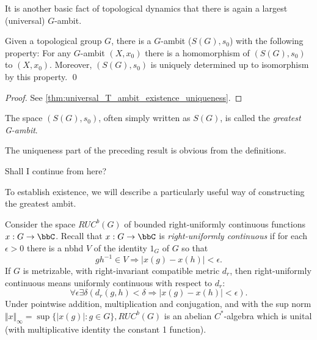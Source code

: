 It is another basic fact of topological dynamics that there is again
a largest (universal) $G$-ambit.

\begin{theorem}
    \label{1.2}
    Given a topological group $G$, there is a
    $G$-ambit ($S(G), s_0$) with the following property:  For any $G$-ambit
    $(X,x_0)$ there is a homomorphism of $(S(G), s_0)$ to $(X,x_0)$.  Moreover,
    $(S(G), s_0)$ is uniquely determined up to isomorphism by this property.
    \qed
\end{theorem}

\begin{proof}
    See \ref{thm:universal_T_ambit_existence_uniqueness}.
\end{proof}

The space $(S(G),s_0)$, often simply written as $S(G)$, is called the {\it
        greatest G-ambit}.

The uniqueness part of the preceding result is obvious from the definitions.


\begin{mynote}
    Shall I continue from here?
\end{mynote}

To establish existence, we will describe a particularly useful way of
constructing the greatest ambit.

Consider the space $RUC^b(G)$ of bounded right-uniformly continuous functions $x:G\rightarrow\bbC$.
Recall that $x:G\rightarrow\bbC$ is {\it right-uniformly continuous} if for
each $\epsilon >0$ there is a nbhd $V$ of the identity $1_G$ of $G$ so that
\[
    gh^{-1}\in V\Rightarrow |x(g)-x(h)|<\epsilon .
\]
If $G$ is metrizable, with right-invariant compatible metric $d_r$, then
right-uniformly continuous means uniformly continuous with respect to $d_r$:
\[
    \forall\epsilon\exists\delta (d_r(g,h)<\delta\Rightarrow |x(g)-x(h)|<
    \epsilon ).
\]
Under pointwise addition, multiplication and conjugation, and with the
sup norm $\Vert x\Vert_\infty =\sup\{|x(g)|:g\in G\}, RUC^b(G)$ is an
abelian $C^*$-algebra which is unital (with multiplicative identity
the constant 1 function).

